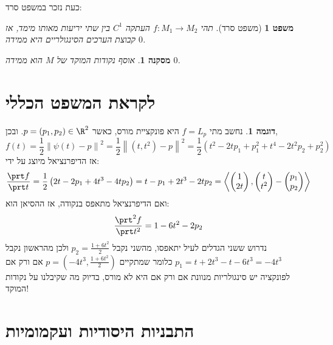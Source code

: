 \documentclass{article}
\newtheorem{corollary}{מסקנה}
\newtheorem*{theorem*}{משפט}
\theoremstyle{definition}
\newtheorem*{example*}{דוגמה}
\newcommand{\norm}[1]{\left\lVert#1\right\rVert}
\begin{document}
	כעת נזכר במשפט סרד:
	\begin{theorem*}[משפט סרד]
		תהי
		\(f:M_1\to M_2\)
		העתקה
		\(C^1\)
		בין שתי יריעות מאותו מימד,
		אז קבוצת הערכים הסינגולריים היא ממידה \(0\).
	\end{theorem*}

	\begin{corollary}\label{measure-zero}
		אוסף נקודות המוקד של \(M\) הוא ממידה \(0\).
	\end{corollary}




	\section{לקראת המשפט הכללי}
	\begin{example*}
		נחשב מתי
		\(f=L_p\)
		היא פונקציית מורס, כאשר
		\(p=(p_1,p_2)\in \R^2\).
		ובכן,
		\[
			f(t)
			=\frac{1}{2}\norm{\psi(t)-p}^2
			=\frac{1}{2}\norm{(t,t^2)-p}^2
			=\frac{1}{2}\left(t^2-2tp_1+p_1^2+t^4-2t^2p_2+p_2^2\right)
		\]
		אז הדיפרנציאל מיוצג על ידי:
		\[
			\frac{\prt f}{\prt t}
			=\frac{1}{2}\left(2t-2p_1+4t^3-4tp_2\right)
			=t-p_1+2t^3-2tp_2
			=\left\langle
				\begin{pmatrix}
					1 \\ 2t
				\end{pmatrix},
				\begin{pmatrix}
					t \\ t^2
				\end{pmatrix}
				-\begin{pmatrix}
				p_1 \\ p_2
				\end{pmatrix}
			\right\rangle
		\]
		ואם הדיפרנציאל מתאפס בנקודה, אז ההסיאן הוא:
		\[
			\frac{\prt^2 f}{\prt t^2}
			=1-6t^2-2p_2
		\]
		נדרוש ששני הגדלים לעיל יתאפסו, מהשני נקבל
		\(p_2=\frac{1+6t^2}{2}\)
		ולכן מהראשון נקבל
		\(p_1=t+2t^3-t-6t^3=-4t^3\)
		כלומר שמתקיים
		\(p=\left(-4t^3,\frac{1+6t^2}{2}\right)\)
		אם ורק אם לפונקציה יש סינגולריות מנוונת אם ורק אם היא לא מורס,
		בדיוק מה שקיבלנו על נקודות המוקד!
	\end{example*}




	\section{התבניות היסודיות ועקמומיות}
	
\end{document}
